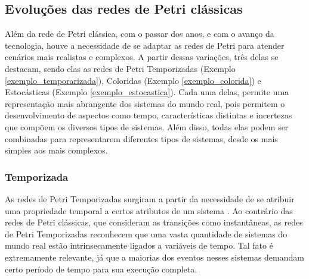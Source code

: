 \documentclass[
	12pt,				%
	openright,			%
	oneside,			%
	a4paper,			%
	english,			%
	brazil				%
	]{abntex2}
\theoremstyle{doispontos}
\newtheorem{exemplo}{Exemplo}
\begin{document}


    


\subsection{Evoluções das redes de Petri clássicas}

Além da rede de Petri clássica, com o passar dos anos, e com o avanço da tecnologia, houve a necessidade de se adaptar as redes de Petri para atender cenários mais realistas e complexos. A partir dessas variações, três delas se destacam, sendo elas as redes de Petri Temporizadas (Exemplo \ref{exemplo_temporarizada}), Coloridas (Exemplo \ref{exemplo_colorida}) e Estocásticas (Exemplo \ref{exemplo_estocastica}). Cada uma delas, permite uma representação mais abrangente dos sistemas do mundo real, pois permitem o desenvolvimento de aspectos como tempo, características distintas e incertezas que compõem os diversos tipos de sistemas. Além disso, todas elas podem ser combinadas para representarem diferentes tipos de sistemas, desde os mais simples aos mais complexos. 

\subsubsection{Temporizada} \label{cap:redeTemporizada}

As redes de Petri Temporizadas surgiram a partir da necessidade de se atribuir uma propriedade temporal a certos atributos de um sistema \textcite{Lima2008}. Ao contrário das redes de Petri clássicas, que consideram as transições como instantâneas, as redes de Petri Temporizadas reconhecem que uma vasta quantidade de sistemas do mundo real estão intrinsecamente ligados a variáveis de tempo. Tal fato é extremamente relevante, já que a maiorias dos eventos nesses sistemas demandam certo período de tempo para sua execução completa.
\end{document}
